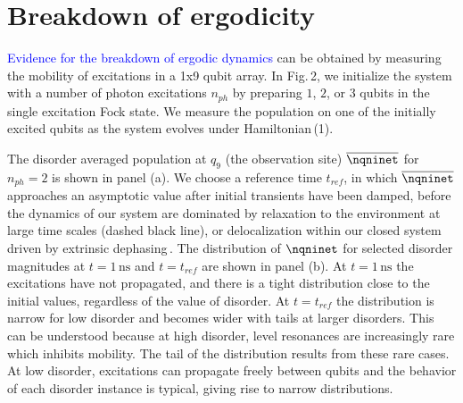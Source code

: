 \section{Breakdown of ergodicity} %
\textcolor{blue}{ Evidence for the breakdown of ergodic dynamics} can be obtained by measuring the mobility of excitations in a 1x9 qubit array. In Fig.\,2, we initialize the system with a number of photon excitations $n_{ph}$ by preparing $1$, $2$, or $3$ qubits in the single excitation Fock state. We measure the population on one of the initially excited qubits as the system evolves under Hamiltonian\,(1).

The disorder averaged population at $q_9$ (the observation site) $\overline{ \nqninet }$ for $n_{ph}=2$ is shown in panel (a). We choose a reference time $t_{ref}$, in which $\overline{ \nqninet }$ approaches an asymptotic value after initial transients have been damped, before the dynamics of our system are dominated by relaxation to the environment at large time scales (dashed black line), or delocalization within our closed system driven by extrinsic dephasing\,\cite{supplement,Znidaric2015, Levi2016, Fischer2016, Luschen2017, vanNieuwenburg2017}. The distribution of $\nqninet$ for selected disorder magnitudes at $t=1\,\text{ns}$ and $t=t_{ref}$ are shown in panel (b). At $t=1\,\text{ns}$ the excitations have not propagated, and there is a tight distribution close to the initial values, regardless of the value of disorder. At $t=t_{ref}$ the distribution is narrow for low disorder and becomes wider with tails at larger disorders. This can be understood because at high disorder, level resonances are increasingly rare which inhibits mobility. The tail of the distribution results from these rare cases. At low disorder, excitations can propagate freely between qubits and the behavior of each disorder instance is typical, giving rise to narrow distributions.

